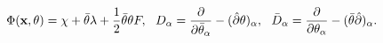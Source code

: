 \begin{equation}
\Phi({\bf x},\theta)=\chi+\bar\theta\lambda+\frac12\bar\theta\theta F,~~
D_\alpha=\frac{\partial}{\partial\bar\theta_\alpha}-(\hat\partial\theta)_\alpha,~~
\bar D_\alpha=\frac{\partial}{\partial\theta_\alpha}-(\bar\theta\hat\partial)_\alpha.
\end{equation}

